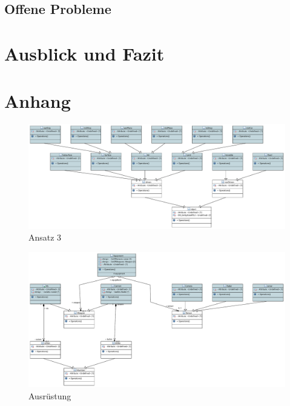 \section{Offene Probleme}

\chapter{Ausblick und Fazit}


\chapter{Anhang}
\begin{figure}
	\centering
	\includegraphics[height = 0.75 \textheight,width =\textwidth]{bilder/pdfvorlagen/ansatz3}
	\caption[Ansatz 3]{Ansatz 3}
	\label{ansatz3}
\end{figure}


\begin{figure}
	\centering
	\includegraphics[height = 0.75\textheight,width =\textwidth]{bilder/pdfvorlagen/equip}
	\caption[Ausrüstung]{Ausrüstung}
	\label{ausrüstung}
\end{figure}
